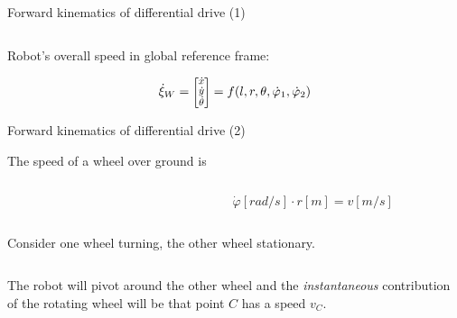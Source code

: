 \documentclass[compress]{beamer}
\newcommand{\colvec}[2][.8]{%
  \scalebox{#1}{%
    \renewcommand{\arraystretch}{.8}%
    $\begin{bmatrix}#2\end{bmatrix}$%
  }
}
\begin{document}
\begin{frame}{Forward kinematics of differential drive (1)}
\begin{columns}
\begin{column}{0.5\linewidth}
{\begin{tikzpicture}
                \end{tikzpicture}
            }

        \end{column}
    \end{columns}

    Robot's overall speed in global reference frame:

    \[
        \dot\xi_W = \colvec{\dot{x} \\ \dot{y} \\ \dot\theta} = f(l, r, \theta,
        \dot\varphi_1, \dot\varphi_2)
        \]

\end{frame}

\begin{frame}{Forward kinematics of differential drive (2)}

    The speed of a wheel over ground is

    \begin{columns}
        \begin{column}{0.5\linewidth}

        \end{column}
        \begin{column}{0.5\linewidth}
            \[
                \dot\varphi [rad/s]\cdot r [m] = v [m/s]
            \]
        \end{column}
    \end{columns}

    \pause
    Consider one wheel turning, the other wheel stationary.
    \vspace{1em}

    \begin{columns}
        \begin{column}{0.5\linewidth}
            The robot will pivot around the other wheel and the
            \emph{instantaneous}
            contribution of the rotating wheel will be that point $C$ has a
            speed $v_C$.


\end{column}
\end{columns}
\end{frame}
\end{document}
